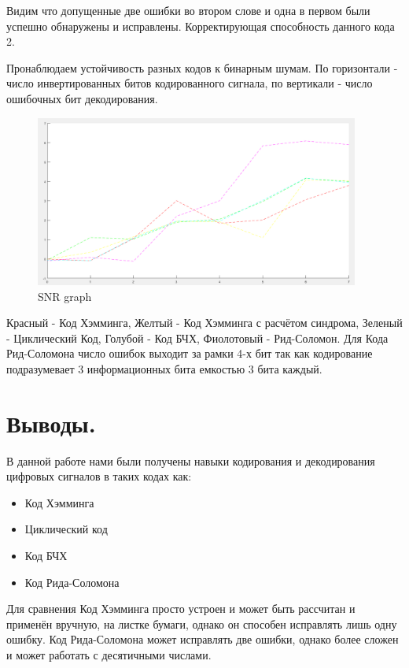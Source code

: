 \documentclass[a4paper,14pt]{extarticle}
\begin{document}
Видим что допущенные две ошибки во втором слове и одна в первом были успешно обнаружены и исправлены. Корректирующая способность данного кода 2.

Пронаблюдаем устойчивость разных кодов к бинарным шумам. По горизонтали - число инвертированных битов кодированного сигнала, по вертикали - число ошибочных бит декодирования.

\begin{figure}[H]
\centering
\includegraphics[width=0.95\textwidth]{waterfall}
\captionsetup{justification=centering,margin=1.0 cm}
\caption{SNR graph}
\label{any}
\end{figure}

Красный - Код Хэмминга, Желтый - Код Хэмминга с расчётом синдрома, Зеленый - Циклический Код, Голубой - Код БЧХ, Фиолотовый - Рид-Соломон.
Для Кода Рид-Соломона число ошибок выходит за рамки 4-х бит так как кодирование подразумевает 3 информационных бита емкостью 3 бита каждый.


\vspace{12cm}


\section{Выводы.}

В данной работе нами были получены навыки кодирования и декодирования цифровых сигналов в таких кодах как:
\begin{itemize}
\item Код Хэмминга
\item Циклический код
\item Код БЧХ
\item Код Рида-Соломона
\end{itemize}
Для сравнения Код Хэмминга просто устроен и может быть рассчитан и применён вручную, на листке бумаги, однако он способен исправлять лишь одну ошибку. Код Рида-Соломона может исправлять две ошибки, однако более сложен и может работать с десятичными числами.
\end{document}

